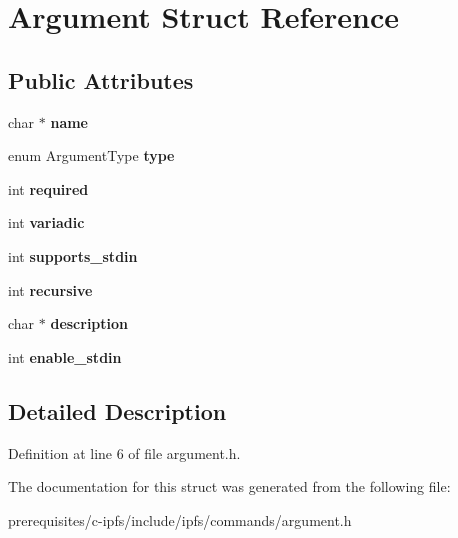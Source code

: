 \hypertarget{struct_argument}{}\section{Argument Struct Reference}
\label{struct_argument}
\subsection*{Public Attributes}
\begin{DoxyCompactItemize}
\item 
\mbox{\label{struct_argument_a234aba40a565b842a398f4d43b5332a1}} 
char $\ast$ {\bfseries name}
\item 
\mbox{\label{struct_argument_a5cbf6044d19eb9183d078d565b844cd8}} 
enum Argument\+Type {\bfseries type}
\item 
\mbox{\label{struct_argument_a59595eb35e14f884441313432e4ec7b6}} 
int {\bfseries required}
\item 
\mbox{\label{struct_argument_ae90ba499f2931c54bbd620f5710ee7a2}} 
int {\bfseries variadic}
\item 
\mbox{\label{struct_argument_a529e73c12b67f4fde9ad30907ffc6c50}} 
int {\bfseries supports\+\_\+stdin}
\item 
\mbox{\label{struct_argument_a665330c3b70ed4537658dbb9e6c9a495}} 
int {\bfseries recursive}
\item 
\mbox{\label{struct_argument_a87406d309631f10ede370568141e8352}} 
char $\ast$ {\bfseries description}
\item 
\mbox{\label{struct_argument_a206a39e3b5968a57303da181b7be0586}} 
int {\bfseries enable\+\_\+stdin}
\end{DoxyCompactItemize}


\subsection{Detailed Description}


Definition at line 6 of file argument.\+h.



The documentation for this struct was generated from the following file\+:\begin{DoxyCompactItemize}
\item 
prerequisites/c-\/ipfs/include/ipfs/commands/argument.\+h\end{DoxyCompactItemize}
